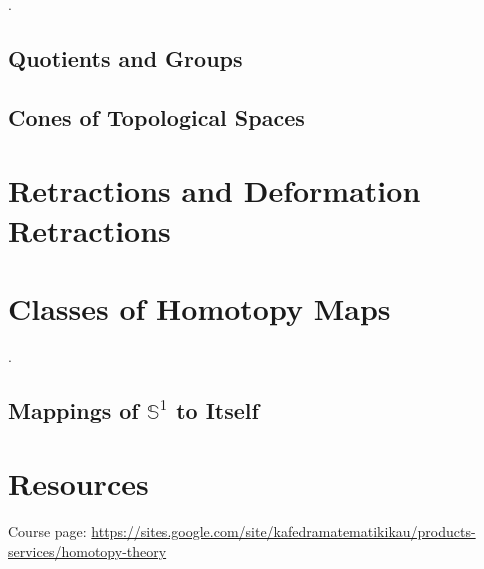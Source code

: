 \documentclass[10pt]{article}
\begin{document}

.


\subsection{Quotients and Groups}

\subsection{Cones of Topological Spaces}

\section{Retractions and Deformation Retractions}

\section{Classes of Homotopy Maps}

.

\subsection{Mappings of $\mathbb{S}^1$ to Itself}


\section{Resources}

Course page: \url{https://sites.google.com/site/kafedramatematikikau/products-services/homotopy-theory}

{}

\end{document}
